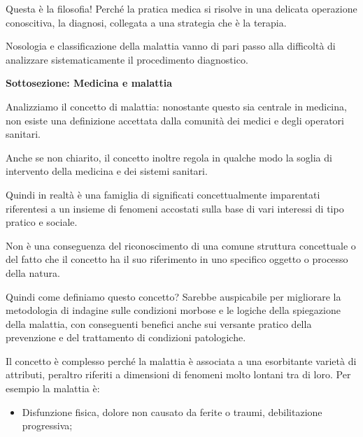 \documentclass[]{article}
\begin{document}
\begin{itemize}
  Questa è la filosofia! Perché la pratica medica si risolve in una
  delicata operazione conoscitiva, la diagnosi, collegata a una
  strategia che è la terapia.

  Nosologia e classificazione della malattia vanno di pari passo alla
  difficoltà di analizzare sistematicamente il procedimento diagnostico.

  \textbf{Sottosezione: Medicina e malattia}

  Analizziamo il concetto di malattia: nonostante questo sia centrale in
  medicina, non esiste una definizione accettata dalla comunità dei
  medici e degli operatori sanitari.

  Anche se non chiarito, il concetto inoltre regola in qualche modo la
  soglia di intervento della medicina e dei sistemi sanitari.

  Quindi in realtà è una famiglia di significati concettualmente
  imparentati riferentesi a un insieme di fenomeni accostati sulla base
  di vari interessi di tipo pratico e sociale.

  Non è una conseguenza del riconoscimento di una comune struttura
  concettuale o del fatto che il concetto ha il suo riferimento in uno
  specifico oggetto o processo della natura.

  Quindi come definiamo questo concetto? Sarebbe auspicabile per
  migliorare la metodologia di indagine sulle condizioni morbose e le
  logiche della spiegazione della malattia, con conseguenti benefici
  anche sui versante pratico della prevenzione e del trattamento di
  condizioni patologiche.

  Il concetto è complesso perché la malattia è associata a una
  esorbitante varietà di attributi, peraltro riferiti a dimensioni di
  fenomeni molto lontani tra di loro. Per esempio la malattia è:
\end{itemize}

\begin{itemize}
\item
  Disfunzione fisica, dolore non causato da ferite o traumi,
  debilitazione progressiva;
\end{itemize}
\end{document}
